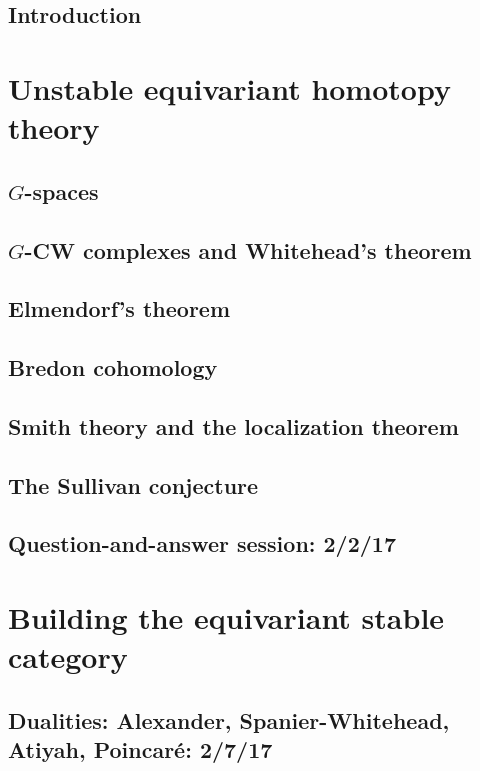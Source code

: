 \documentclass[openany]{style_EHT}
\begin{document}
\frontmatter

\frontstuff %

\section{Introduction}
	

\mainmatter

\chapter{Unstable equivariant homotopy theory}
\section{$G$-spaces}
	
\section{$G$-CW complexes and Whitehead's theorem}
	
\section{Elmendorf's theorem}
	
\section{Bredon cohomology}
	
\section{Smith theory and the localization theorem}
	
\section{The Sullivan conjecture}
	
\section{Question-and-answer session: 2/2/17}
	

\chapter{Building the equivariant stable category}
\section{Dualities: Alexander, Spanier-Whitehead, Atiyah, Poincaré: 2/7/17}
	
\end{document}
